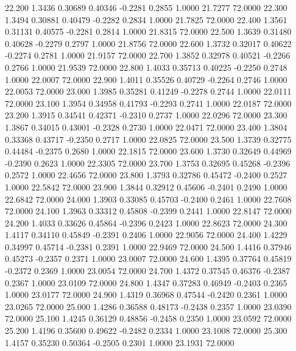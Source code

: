   22.200   1.3436   0.30689   0.40346  -0.2281   0.2855   1.0000  21.7277  72.0000
  22.300   1.3494   0.30881   0.40479  -0.2282   0.2834   1.0000  21.7825  72.0000
  22.400   1.3561   0.31131   0.40575  -0.2281   0.2814   1.0000  21.8315  72.0000
  22.500   1.3639   0.31480   0.40628  -0.2279   0.2797   1.0000  21.8756  72.0000
  22.600   1.3732   0.32017   0.40622  -0.2274   0.2781   1.0000  21.9157  72.0000
  22.700   1.3852   0.32978   0.40521  -0.2266   0.2766   1.0000  21.9539  72.0000
  22.800   1.4033   0.35713   0.40225  -0.2250   0.2748   1.0000  22.0007  72.0000
  22.900   1.4011   0.35526   0.40729  -0.2264   0.2746   1.0000  22.0053  72.0000
  23.000   1.3985   0.35281   0.41249  -0.2278   0.2744   1.0000  22.0111  72.0000
  23.100   1.3954   0.34958   0.41793  -0.2293   0.2741   1.0000  22.0187  72.0000
  23.200   1.3915   0.34541   0.42371  -0.2310   0.2737   1.0000  22.0296  72.0000
  23.300   1.3867   0.34015   0.43001  -0.2328   0.2730   1.0000  22.0471  72.0000
  23.400   1.3804   0.33368   0.43717  -0.2350   0.2717   1.0000  22.0825  72.0000
  23.500   1.3739   0.32775   0.44484  -0.2375   0.2680   1.0000  22.1815  72.0000
  23.600   1.3730   0.32649   0.44969  -0.2390   0.2623   1.0000  22.3305  72.0000
  23.700   1.3753   0.32695   0.45268  -0.2396   0.2572   1.0000  22.4656  72.0000
  23.800   1.3793   0.32786   0.45472  -0.2400   0.2527   1.0000  22.5842  72.0000
  23.900   1.3844   0.32912   0.45606  -0.2401   0.2490   1.0000  22.6842  72.0000
  24.000   1.3903   0.33085   0.45703  -0.2400   0.2461   1.0000  22.7608  72.0000
  24.100   1.3963   0.33312   0.45808  -0.2399   0.2441   1.0000  22.8147  72.0000
  24.200   1.4033   0.33626   0.45864  -0.2396   0.2423   1.0000  22.8623  72.0000
  24.300   1.4117   0.34110   0.45849  -0.2391   0.2406   1.0000  22.9056  72.0000
  24.400   1.4229   0.34997   0.45714  -0.2381   0.2391   1.0000  22.9469  72.0000
  24.500   1.4416   0.37946   0.45273  -0.2357   0.2371   1.0000  23.0007  72.0000
  24.600   1.4395   0.37764   0.45819  -0.2372   0.2369   1.0000  23.0054  72.0000
  24.700   1.4372   0.37545   0.46376  -0.2387   0.2367   1.0000  23.0109  72.0000
  24.800   1.4347   0.37283   0.46949  -0.2403   0.2365   1.0000  23.0177  72.0000
  24.900   1.4319   0.36968   0.47544  -0.2420   0.2361   1.0000  23.0265  72.0000
  25.000   1.4286   0.36588   0.48173  -0.2438   0.2357   1.0000  23.0390  72.0000
  25.100   1.4245   0.36129   0.48856  -0.2458   0.2350   1.0000  23.0592  72.0000
  25.200   1.4196   0.35600   0.49622  -0.2482   0.2334   1.0000  23.1008  72.0000
  25.300   1.4157   0.35230   0.50364  -0.2505   0.2301   1.0000  23.1931  72.0000
